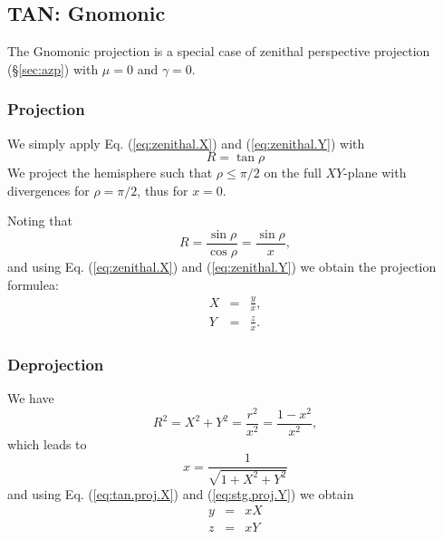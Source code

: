 \subsection{TAN: Gnomonic}

  The Gnomonic projection is a special case of zenithal perspective
  projection (\S \ref{sec:azp}) with $\mu=0$ and $\gamma=0$.

  \subsubsection{Projection}

    We simply apply Eq. (\ref{eq:zenithal.X}) and  (\ref{eq:zenithal.Y})
    with
    \begin{equation}
      R = \tan\rho
    \end{equation}
    We project the hemisphere such that $\rho\le\pi/2$ on the full $XY$-plane
    with divergences for $\rho=\pi/2$, thus for $x=0$.

    Noting that
    \begin{equation}
      R = \frac{\sin\rho}{\cos\rho} = \frac{\sin\rho}{x},
    \end{equation}
    and using Eq. (\ref{eq:zenithal.X}) and (\ref{eq:zenithal.Y}) we obtain
    the projection formulea:
    \begin{eqnarray}
      X & = & \frac{y}{x}, \label{eq:tan.proj.X} \\
      Y & = & \frac{z}{x}. \label{eq:stg.proj.Y}
    \end{eqnarray}

  \subsubsection{Deprojection}

    We have
    \begin{equation}
      R^2 = X^2 + Y^2 = \frac{r^2}{x^2} = \frac{1 - x^2}{x^2},
    \end{equation}
    which leads to
    \begin{equation}
      x = \frac{1}{\sqrt{1 + X^2 + Y^2}}
    \end{equation}
    and using Eq. (\ref{eq:tan.proj.X}) and (\ref{eq:stg.proj.Y}) we obtain
    \begin{eqnarray}
      y & = & xX \\
      z & = & xY
    \end{eqnarray}


